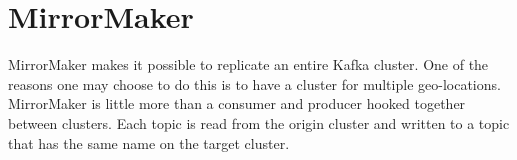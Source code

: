 \section{MirrorMaker}

MirrorMaker makes it possible to replicate an entire Kafka cluster. One of the reasons one may choose to do this is to have a cluster for multiple geo-locations. MirrorMaker is little more than a consumer and producer hooked together between clusters. Each topic is read from the origin cluster and written to a topic that has the same name on the target cluster.